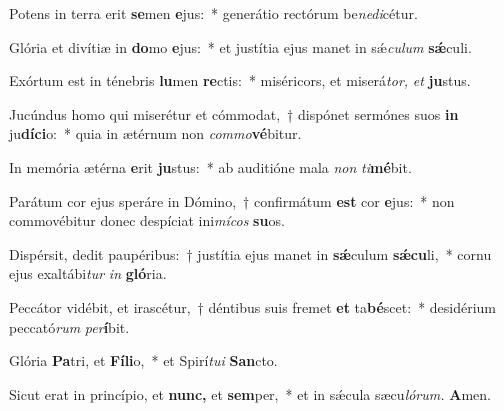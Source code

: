 \item Potens in terra erit \textbf{se}men \textbf{e}jus:~* generátio rectórum be\textit{nedi}\hspace{-0.01em}cétur.
\item Glória et divítiæ in \textbf{do}mo \textbf{e}jus:~* et justítia ejus manet in sǽ\hspace{0.03em}\textit{culum} \textbf{sǽ}culi.
\item Exórtum est in ténebris \textbf{lu}men \textbf{re}ctis:~* miséricors, et miserá\hspace{0.03em}\textit{tor,} \textit{et} \textbf{ju}stus.
\item Jucúndus homo qui miserétur et cómmodat,~† dispónet sermónes suos \textbf{in} ju\textbf{díci}o:~* quia in ætérnum non \textit{commo}\textbf{vé}bitur.
\item In memória ætérna \textbf{e}rit \textbf{ju}stus:~* ab auditióne mala \textit{non} \textit{ti}\hspace{-0.01em}\textbf{mé}bit.
\item Parátum cor ejus speráre in Dómino,~† confirmátum \textbf{est} cor \textbf{e}jus:~* non commovébitur donec despíciat ini\textit{mícos} \textbf{su}os.
\item Dispérsit, dedit paupéribus:~† justítia ejus manet in \textbf{sǽ}culum \textbf{sǽcu}li,~* cornu ejus exaltábi\textit{tur} \textit{in} \textbf{gló}ria.
\item Peccátor vidébit, et irascétur,~† déntibus suis fremet \textbf{et} ta\textbf{bé}scet:~* desidérium peccató\textit{rum} \textit{per}\textbf{í}bit.
\item Glória \textbf{Pa}tri, et \textbf{Fíli}o,~* et Spirí\hspace{0.03em}\textit{tui} \textbf{San}cto.
\item Sicut erat in princípio, et \textbf{nunc,} et \textbf{sem}per,~* et in sǽcula sæcu\hspace{0.03em}\textit{lórum.} \textbf{A}men.
